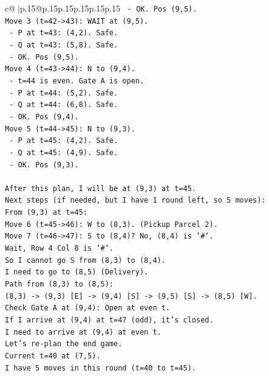 \documentclass{article}
\begin{document}
{\begin{supertabular}{c@{$\;$}|p{.15\linewidth}@{}p{.15\linewidth}p{.15\linewidth}p{.15\linewidth}p{.15\linewidth}p{.15\linewidth}}
{{{\texttt{  {-} OK. Pos (9,5).} \\
\texttt{Move 3 (t=42{-}>43): WAIT at (9,5).} \\
\texttt{  {-} P at t=43: (4,2). Safe.} \\
\texttt{  {-} Q at t=43: (5,8). Safe.} \\
\texttt{  {-} OK. Pos (9,5).} \\
\texttt{Move 4 (t=43{-}>44): N to (9,4).} \\
\texttt{  {-} t=44 is even. Gate A is open.} \\
\texttt{  {-} P at t=44: (5,2). Safe.} \\
\texttt{  {-} Q at t=44: (6,8). Safe.} \\
\texttt{  {-} OK. Pos (9,4).} \\
\texttt{Move 5 (t=44{-}>45): N to (9,3).} \\
\texttt{  {-} P at t=45: (4,2). Safe.} \\
\texttt{  {-} Q at t=45: (4,9). Safe.} \\
\texttt{  {-} OK. Pos (9,3).} \\
\\ 
\texttt{After this plan, I will be at (9,3) at t=45.} \\
\texttt{Next steps (if needed, but I have 1 round left, so 5 moves):} \\
\texttt{From (9,3) at t=45:} \\
\texttt{Move 6 (t=45{-}>46): W to (8,3). (Pickup Parcel 2).} \\
\texttt{Move 7 (t=46{-}>47): S to (8,4)? No, (8,4) is `\#`.} \\
\texttt{Wait, Row 4 Col 8 is `\#`.} \\
\texttt{So I cannot go S from (8,3) to (8,4).} \\
\texttt{I need to go to (8,5) (Delivery).} \\
\texttt{Path from (8,3) to (8,5):} \\
\texttt{(8,3) {-}> (9,3) {[}E{]} {-}> (9,4) {[}S{]} {-}> (9,5) {[}S{]} {-}> (8,5) {[}W{]}.} \\
\texttt{Check Gate A at (9,4): Open at even t.} \\
\texttt{If I arrive at (9,4) at t=47 (odd), it's closed.} \\
\texttt{I need to arrive at (9,4) at even t.} \\
\texttt{Let's re{-}plan the end game.} \\
\texttt{Current t=40 at (7,5).} \\
\texttt{I have 5 moves in this round (t=40 to t=45).} \\
}}}
\end{supertabular}}
\end{document}
